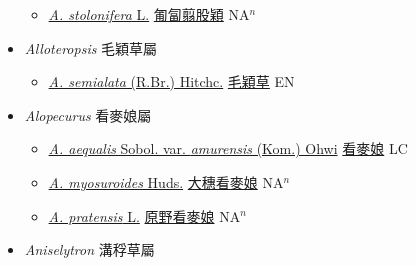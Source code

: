 \begin{itemize}
\begin{itemize}
        \item[] \href{http://www.theplantlist.org/tpl1.1/search?q=Agrostis+stolonifera}{\textit{A. stolonifera} L.}   \href{\detokenize{http://taibnet.sinica.edu.tw/chi/taibnet_species_list.php?T2=匍匐翦股穎&T2_new_value=true&fr=y}}{匍匐翦股穎} NA$^n$
  \end{itemize}
 \item[] \textit{Alloteropsis} 毛穎草屬
                    
  \begin{itemize}
        \item[] \href{http://www.theplantlist.org/tpl1.1/search?q=Alloteropsis+semialata}{\textit{A. semialata} (R.Br.) Hitchc.}   \href{\detokenize{http://taibnet.sinica.edu.tw/chi/taibnet_species_list.php?T2=毛穎草&T2_new_value=true&fr=y}}{毛穎草} EN
  \end{itemize}
 \item[] \textit{Alopecurus} 看麥娘屬
                    
  \begin{itemize}
        \item[] \href{http://www.theplantlist.org/tpl1.1/search?q=Alopecurus+aequalis+var.+amurensis}{\textit{A. aequalis} Sobol. var. \textit{amurensis} (Kom.) Ohwi}   \href{\detokenize{http://taibnet.sinica.edu.tw/chi/taibnet_species_list.php?T2=看麥娘&T2_new_value=true&fr=y}}{看麥娘} LC
        \item[] \href{http://www.theplantlist.org/tpl1.1/search?q=Alopecurus+myosuroides}{\textit{A. myosuroides} Huds.}   \href{\detokenize{http://taibnet.sinica.edu.tw/chi/taibnet_species_list.php?T2=大穗看麥娘&T2_new_value=true&fr=y}}{大穗看麥娘} NA$^n$
        \item[] \href{http://www.theplantlist.org/tpl1.1/search?q=Alopecurus+pratensis}{\textit{A. pratensis} L.}   \href{\detokenize{http://taibnet.sinica.edu.tw/chi/taibnet_species_list.php?T2=原野看麥娘&T2_new_value=true&fr=y}}{原野看麥娘} NA$^n$
  \end{itemize}
 \item[] \textit{Aniselytron} 溝稃草屬
                    

\end{itemize}
